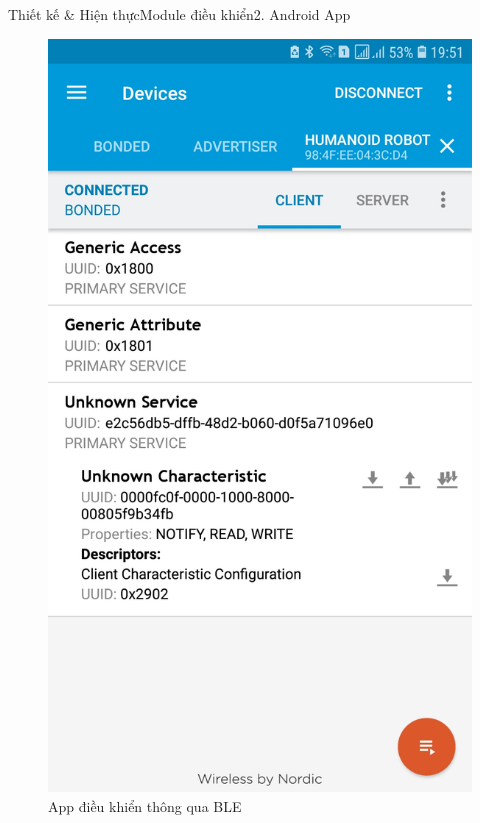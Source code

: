 \documentclass[compress, blue, 13pt,hyperref={pdfpagemode=FullScreen}]{beamer}
\begin{document}
\begin{frame}{Thiết kế \& Hiện thực}{Module điều khiển}{2. Android App}
\transblindshorizontal
\begin{figure}[hbtp]
\centering
\includegraphics[scale=0.085]{images/Screenshot_20180607-195153_nRFConnect.jpg}
\caption{App điều khiển thông qua BLE}
\end{figure}
\end{frame}
\end{document}
